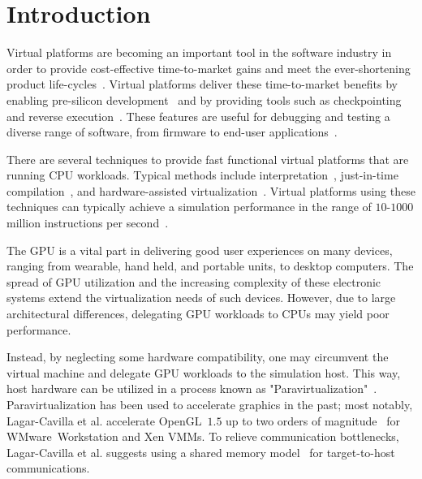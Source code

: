 
\section{Introduction}
\label{sec:introduction}
Virtual platforms are becoming an important tool in the software industry in order to provide cost-effective time-to-market gains and meet the ever-shortening product life-cycles~\cite{journals:magnusson:2002, journals:yi:2006, publications:leupers:2010, publications:aarno:2014}.
Virtual platforms deliver these time-to-market benefits by enabling pre-silicon development~ and by providing tools such as checkpointing and reverse execution~.
These features are useful for debugging and testing a diverse range of software, from firmware to end-user applications~.

There are several techniques to provide fast functional virtual platforms that are running CPU workloads.
Typical methods include interpretation~, just-in-time compilation~, and hardware-assisted virtualization~.
Virtual platforms using these techniques can typically achieve a simulation performance in the range of $10$-$1000$ million instructions per second~.

The GPU is a vital part in delivering good user experiences on many devices, ranging from wearable, hand held, and portable units, to desktop computers.
The spread of GPU utilization and the increasing complexity of these electronic systems extend the virtualization needs of such devices.
However, due to large architectural differences, delegating GPU workloads to CPUs may yield poor performance.

Instead, by neglecting some hardware compatibility, one may circumvent the virtual machine and delegate GPU workloads to the simulation host.
This way, host hardware can be utilized in a process known as "Paravirtualization"~.
Paravirtualization has been used to accelerate graphics in the past; most notably, Lagar-Cavilla et al. accelerate OpenGL~$1.5$ up to two orders of magnitude~ for WMware~Workstation and Xen VMMs.
To relieve communication bottlenecks, Lagar-Cavilla et al. suggests using a shared memory model~ for target-to-host communications.

